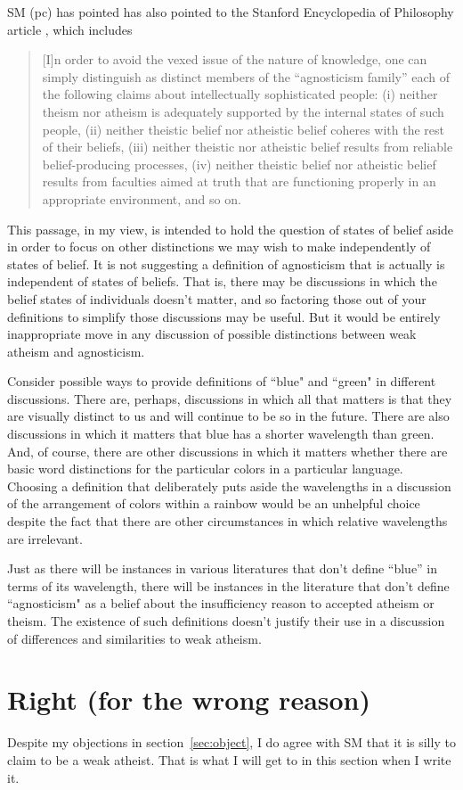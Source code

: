 \documentclass[12pt]{article}
\begin{document}
SM (pc) has pointed has also pointed to the
Stanford Encyclopedia of Philosophy
article , which includes 
\begin{quotation}
    [I]n order to avoid the vexed issue of the nature of knowledge, one can simply distinguish as distinct members of the “agnosticism family” each of the following claims about intellectually sophisticated people: (i) neither theism nor atheism is adequately supported by the internal states of such people, (ii) neither theistic belief nor atheistic belief coheres with the rest of their beliefs, (iii) neither theistic nor atheistic belief results from reliable belief-producing processes, (iv) neither theistic belief nor atheistic belief results from faculties aimed at truth that are functioning properly in an appropriate environment, and so on. \autocite{sep-atheism-agnosticism}
\end{quotation}
This passage, in my view, is intended to hold the question of states of belief aside in order to focus on other distinctions we may wish to make independently of states of belief.
It is not suggesting a definition of agnosticism that is actually is independent of states of beliefs.
That is, there may be discussions in which the belief states of individuals doesn't matter, and so factoring those out of your definitions to simplify those discussions may be useful.
But it would be entirely inappropriate move in any discussion of possible distinctions between weak atheism and agnosticism.

Consider possible ways to provide definitions of “blue" and “green" in different discussions.
There are, perhaps, discussions in which all that matters is that they are visually distinct to us and will continue to be so in the future. 
There are also discussions in which it matters that blue has a shorter wavelength than green.
And, of course, there are other discussions in which it matters whether there are basic word distinctions for the particular colors in a particular language.
Choosing a definition that deliberately puts aside the wavelengths in a discussion of the arrangement of colors within a rainbow would be an unhelpful choice despite the fact that there are other circumstances in which relative wavelengths are irrelevant.

Just as there will be instances in various literatures that don't define “blue” in terms of its wavelength, there will be instances in the literature that don't define “agnosticism" as a belief about the insufficiency reason to accepted atheism or theism. The existence of such definitions doesn't justify their use in a discussion of differences and similarities to weak atheism.

\section{Right (for the wrong reason)}

Despite my objections in section~\ref{sec:object}, I do agree with SM that it is silly to claim to be a weak atheist. That is what I will get to in this section when I write it.

\printbibliography
\end{document}

